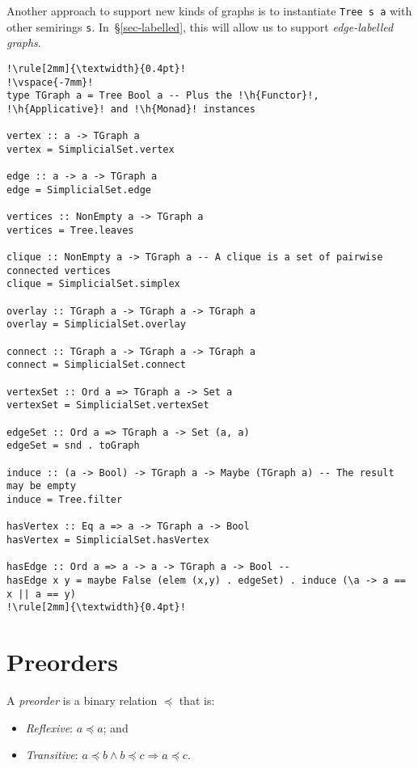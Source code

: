 \documentclass[english,submission]{programming}
\newcommand{\code}[1]{\lstinline[mathescape]|#1|}
\newcommand{\hcode}[1]{{\color{darkblue} \lstinline[keywordstyle={}]|#1|}} %
\newcommand{\h}[1]{{\itshape\color{grayblue}#1}} %
\begin{document}
\noindent
Another approach to support new kinds of graphs is to instantiate
\hcode{Tree s a} with other semirings \hcode{s}. In~\S\ref{sec-labelled}, this
will allow us to support \emph{edge-labelled graphs}.

\begin{lstlisting}[float,label=lst-graph,xleftmargin=0pt,caption={
    Implementing a part of the \code{Algebra.G}\code{raph} API~\cite{mokhov_alga}
    with \hcode{TGraph}.
}]
!\rule[2mm]{\textwidth}{0.4pt}!
!\vspace{-7mm}!
type TGraph a = Tree Bool a -- Plus the !\h{Functor}!, !\h{Applicative}! and !\h{Monad}! instances

vertex :: a -> TGraph a
vertex = SimplicialSet.vertex

edge :: a -> a -> TGraph a
edge = SimplicialSet.edge

vertices :: NonEmpty a -> TGraph a
vertices = Tree.leaves

clique :: NonEmpty a -> TGraph a -- A clique is a set of pairwise connected vertices
clique = SimplicialSet.simplex

overlay :: TGraph a -> TGraph a -> TGraph a
overlay = SimplicialSet.overlay

connect :: TGraph a -> TGraph a -> TGraph a
connect = SimplicialSet.connect

vertexSet :: Ord a => TGraph a -> Set a
vertexSet = SimplicialSet.vertexSet

edgeSet :: Ord a => TGraph a -> Set (a, a)
edgeSet = snd . toGraph

induce :: (a -> Bool) -> TGraph a -> Maybe (TGraph a) -- The result may be empty
induce = Tree.filter

hasVertex :: Eq a => a -> TGraph a -> Bool
hasVertex = SimplicialSet.hasVertex

hasEdge :: Ord a => a -> a -> TGraph a -> Bool --
hasEdge x y = maybe False (elem (x,y) . edgeSet) . induce (\a -> a == x || a == y)
!\rule[2mm]{\textwidth}{0.4pt}!
\end{lstlisting}

\section{Preorders}\label{sec-preorder}

A \emph{preorder} is a binary relation $\preceq$ that is:

\begin{itemize}
    \item \emph{Reflexive}: $a \preceq a$; and
    \item \emph{Transitive}: $a \preceq b \wedge b \preceq c \Rightarrow a \preceq c$.
\end{itemize}
\end{document}
